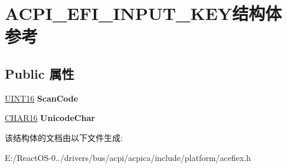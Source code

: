 \hypertarget{struct_a_c_p_i___e_f_i___i_n_p_u_t___k_e_y}{}\section{A\+C\+P\+I\+\_\+\+E\+F\+I\+\_\+\+I\+N\+P\+U\+T\+\_\+\+K\+E\+Y结构体 参考}
\label{struct_a_c_p_i___e_f_i___i_n_p_u_t___k_e_y}
\subsection*{Public 属性}
\begin{DoxyCompactItemize}
\item 
\mbox{\label{struct_a_c_p_i___e_f_i___i_n_p_u_t___k_e_y_a7b2aa2311b1b6024c7461742ae0aee14}} 
\hyperlink{_processor_bind_8h_a09f1a1fb2293e33483cc8d44aefb1eb1}{U\+I\+N\+T16} {\bfseries Scan\+Code}
\item 
\mbox{\label{struct_a_c_p_i___e_f_i___i_n_p_u_t___k_e_y_a0a687b3237eec7371bcdba87eede8d56}} 
\hyperlink{_processor_bind_8h_a7ae886893bd2a2ae253eb2b021a48724}{C\+H\+A\+R16} {\bfseries Unicode\+Char}
\end{DoxyCompactItemize}


该结构体的文档由以下文件生成\+:\begin{DoxyCompactItemize}
\item 
E\+:/\+React\+O\+S-\/0../drivers/bus/acpi/acpica/include/platform/acefiex.\+h\end{DoxyCompactItemize}
